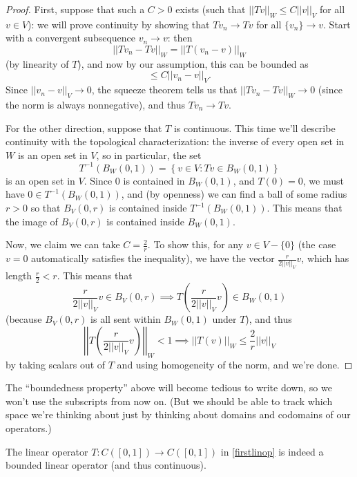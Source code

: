 \begin{proof}
First, suppose that such a $C > 0$ exists (such that $||Tv||_W \le C||v||_V$ for all $v \in V$): we will prove continuity by showing that $Tv_n \to Tv$ for all $\{v_n\} \to v$. Start with a convergent subsequence $v_n \to v$: then 
\[
    ||Tv_n - Tv||_W = ||T(v_n - v)||_W
\]
(by linearity of $T$), and now by our assumption, this can be bounded as 
\[
    \le C||v_n - v||_V.
\]
Since $||v_n - v||_V \to 0$, the squeeze theorem tells us that $||Tv_n - Tv||_W \to 0$ (since the norm is always nonnegative), and thus $Tv_n \to Tv$. 

For the other direction, suppose that $T$ is continuous. This time we'll describe continuity with the topological characterization: the inverse of every open set in $W$ is an open set in $V$, so in particular, the set
\[
    T^{-1}(B_W(0, 1)) = \left\{v \in V: Tv \in B_W(0, 1)\right\}
\]
is an open set in $V$. Since $0$ is contained in $B_W(0, 1)$, and $T(0) = 0$, we must have $0 \in T^{-1}(B_W(0, 1))$, and (by openness) we can find a ball of some radius $r > 0$ so that $B_V(0, r)$ is contained inside $T^{-1}(B_W(0, 1))$. This means that the image of $B_V(0, r)$ is contained inside $B_W(0, 1)$.

Now, we claim we can take $C = \frac{2}{r}$. To show this, for any $v \in V - \{0\}$ (the case $v = 0$ automatically satisfies the inequality), we have the vector $\frac{r}{2||v||_V} v$, which has length $\frac{r}{2} < r$. This means that 
\[
    \frac{r}{2||v||_V} v \in B_V(0, r) \implies T\left(\frac{r}{2||v||_V} v\right) \in B_W(0, 1)
\]
(because $B_V(0, r)$ is all sent within $B_W(0, 1)$ under $T$), and thus 
\[
    \left|\left|T\left(\frac{r}{2||v||_V} v\right)\right|\right|_W < 1 \implies ||T(v)||_W \le \frac{2}{r} ||v||_V
\]
by taking scalars out of $T$ and using homogeneity of the norm, and we're done.
\end{proof}

The ``boundedness property'' above will become tedious to write down, so we won't use the subscripts from now on. (But we should be able to track which space we're thinking about just by thinking about domains and codomains of our operators.)

\begin{example}
The linear operator $T: C([0, 1]) \to C([0, 1])$ in \cref{firstlinop} is indeed a bounded linear operator (and thus continuous).
\end{example}


